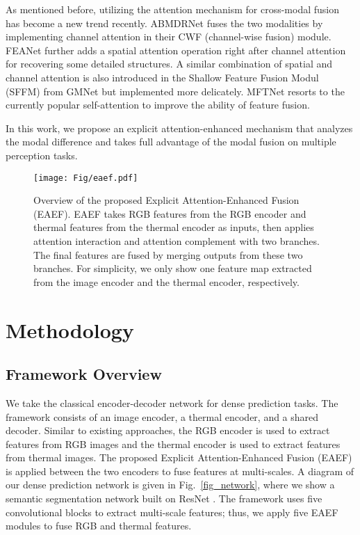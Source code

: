 \documentclass[letterpaper, 10 pt, journal, twoside]{IEEEtran}
\begin{document}
As mentioned before, utilizing the attention mechanism for cross-modal fusion has become a new trend recently. ABMDRNet \cite{ABMDRNet} fuses the two modalities by implementing channel attention in their CWF (channel-wise fusion) module. FEANet \cite{FEANet} further adds a spatial attention operation right after channel attention for recovering some detailed structures. A similar combination of spatial and channel attention is also introduced in the Shallow Feature Fusion Modul (SFFM) from GMNet \cite{GMNet} but implemented more delicately. MFTNet \cite{MFTNet} resorts to the currently popular self-attention to improve the ability of feature fusion.

In this work, we propose an explicit attention-enhanced mechanism that analyzes the modal difference and takes full advantage of the modal fusion on multiple perception tasks.











\begin{figure*}[t!]
    \centering
    \texttt{[image: Fig/eaef.pdf]}
    \vspace{-2mm}
    \caption{Overview of the proposed Explicit Attention-Enhanced Fusion (EAEF). EAEF takes RGB features  from the RGB encoder and thermal features  from the thermal encoder as inputs, then applies attention interaction and attention complement with two branches. The final features are fused by merging outputs from these two branches. For simplicity, we only show one feature map extracted from the image encoder and the thermal encoder, respectively.
}
    \label{fig_eaef}
\end{figure*}

\section{Methodology}
\label{sec:intro}


 \subsection{Framework Overview}
 We take the classical encoder-decoder network for dense prediction tasks. The framework consists of an image encoder, a thermal encoder, and a shared decoder.
 Similar to existing approaches, the RGB encoder is used to extract features from RGB images and the thermal encoder is used to extract features from thermal images. The proposed Explicit Attention-Enhanced Fusion (EAEF) is applied between the two encoders to fuse features at multi-scales. A diagram of our dense prediction network is given in Fig.~\ref{fig_network}, where we show a semantic segmentation network built on ResNet \cite{ResNet}. 
 The framework uses five convolutional blocks to extract multi-scale features; thus, we apply five EAEF modules to fuse RGB and thermal features. 
 
\end{document}
